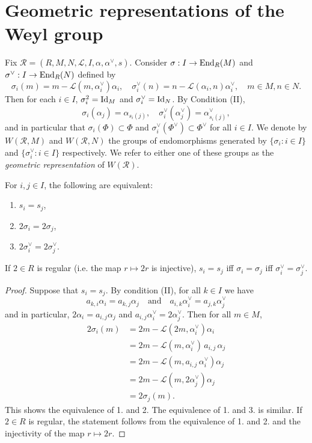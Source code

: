 
\section{Geometric representations of the Weyl group}
Fix $\mathcal{R} = (R,M,N,\mathcal{L},I,\alpha, \alpha^\vee,s)$. Consider $\sigma: I \to {\rm End}_R(M)$ and 
$\sigma^\vee : I \to {\rm End}_R(N)$ defined by
\[
    \sigma_i(m) = m - \mathcal{L}(m,\alpha^\vee_i)\alpha_i, \quad \sigma^\vee_i(n) = n - \mathcal{L}(\alpha_i,n)\alpha^\vee_i, \quad m \in M, n \in N.
\]
Then for each $i \in I$, $\sigma_i^2 = {\rm Id}_M$ and $\sigma_i^\vee = {\rm Id}_N$. By Condition (II), 
\[
    \sigma_i(\alpha_j) = \alpha_{s_i(j)}, \quad \sigma^\vee_i(\alpha^\vee_j) = \alpha^\vee_{s_i(j)},
\]
and in particular that $\sigma_i(\Phi) \subset \Phi$ and 
$\sigma_i^\vee(\Phi^\vee) \subset \Phi^\vee$ for all $i \in I$. We denote by $W(\mathcal{R},M)$ and $W(\mathcal{R},N)$ the groups of endomorphisms generated by $\{\sigma_i : i \in I\}$ and $\{\sigma_i^\vee : i \in I\}$ respectively. We refer to either one of these groups as the {\it geometric representation} of $W(\mathcal{R})$.

\begin{lemma}
    For $i,j \in I$, the following are equivalent:
    \begin{enumerate}
        \item $s_i = s_j$,
        \item $2\sigma_i = 2\sigma_j$,
        \item $2\sigma_i^\vee = 2\sigma_j^\vee$.
    \end{enumerate}
    If $2 \in R$ is regular (i.e. the map $r \mapsto 2r$ is injective), $s_i = s_j$ iff
    $\sigma_i = \sigma_j$ iff $\sigma_i^\vee = \sigma_j^\vee$.  
\end{lemma}
\begin{proof}
Suppose that $s_i = s_j$. By condition (II), for all $k \in I$ we have
\[
    a_{k,i}\alpha_i = a_{k,j}\alpha_j \quad \text{and} \quad a_{i,k}\alpha_i^\vee = a_{j,k}\alpha_j^\vee
\]
and in particular, $2\alpha_i = a_{i,j}\alpha_j$ and $a_{i,j}\alpha_i^\vee = 2 \alpha_j^\vee$. Then for all $m \in M$,
\begin{align*}
    2\sigma_i(m) &= 2m - \mathcal{L}(2m,\alpha^\vee_i)\alpha_i \\
                &= 2m - \mathcal{L}(m,\alpha^\vee_i)\, a_{i,j} \,\alpha_j\\
                &= 2m - \mathcal{L}(m,a_{i,j}\, \alpha^\vee_i)\alpha_j\\
                &= 2m - \mathcal{L}(m,2\alpha^\vee_j)\alpha_j\\
                &= 2 \sigma_j(m).
\end{align*}
This shows the equivalence of 1. and 2. The equivalence of 1. and 3. is similar. If $2 \in R$ is regular, 
the statement follows from the equivalence of 1. and 2. and the injectivity of the map $r \mapsto 2r$.
\end{proof}

